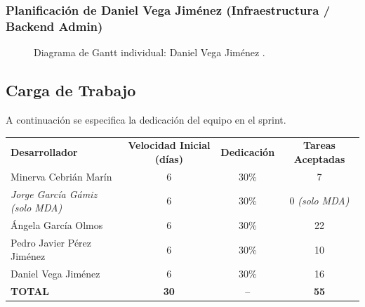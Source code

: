\subsubsection{Planificación de Daniel Vega Jiménez (Infraestructura / Backend Admin)}

\begin{figure}[H]
\centering
{}
\caption{Diagrama de Gantt individual: Daniel Vega Jiménez .}
\end{figure}

\subsection{Carga de Trabajo}
A continuación se especifica la dedicación del equipo en el sprint.

\vspace{0.3cm}
\begin{center}
\begin{tabularx}{\textwidth}{X c c c}
\rowcolor{azulPastelApagado}
\textbf{\color{white}Desarrollador} & \textbf{\color{white}Velocidad Inicial (días)} & \textbf{\color{white}Dedicación} & \textbf{\color{white}Tareas Aceptadas} \\
Minerva Cebrián Marín & 6 & 30\% & 7 \\
\textit{Jorge García Gámiz (solo MDA)} & 6 & 30\% & 0 \textit{(solo MDA)} \\
Ángela García Olmos & 6 & 30\% & 22 \\
Pedro Javier Pérez Jiménez & 6 & 30\% & 10 \\
Daniel Vega Jiménez & 6 & 30\% & 16 \\
\rowcolor{azulclaro!50}
\textbf{TOTAL} & \textbf{30} & -- & \textbf{55} \\
\end{tabularx}
\end{center}
\vspace{0.3cm}

